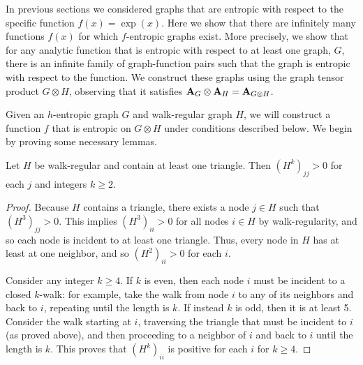 In previous sections we considered graphs that are entropic with respect to the specific function $f(x) = \exp(x)$.
Here we show that there are infinitely many functions $f(x)$ for which $f$-entropic graphs exist.
More precisely, we show that for any analytic function that is entropic with respect to at least one graph, $G$, there is an infinite family of graph-function pairs such that the graph is entropic with respect to the function.
We construct these graphs using the graph tensor product $G \otimes H$, observing that it
satisfies $\textbf{A}_{G} \otimes \textbf{A}_{H} = \textbf{A}_{G \otimes H}$.

Given an $h$-entropic graph $G$ and walk-regular graph $H$, we will construct a function $f$ that is entropic on $G \otimes H$ under conditions described below.
We begin by proving some necessary lemmas.
\begin{lemma}\label{lem:walk-reg-triangle}
  Let $H$ be walk-regular and contain at least one triangle.
  Then $(H^k)_{jj} > 0$ for each $j$ and integers $k \geq 2$.
\end{lemma}
\begin{proof}
  Because $H$ contains a triangle, there exists a node $j \in H$ such that $(H^3)_{jj} > 0$.
  This implies $(H^3)_{ii} > 0$ for all nodes $i \in H$ by walk-regularity,
  and so each node is incident to at least one triangle.
  Thus, every node in $H$ has at least at one neighbor, and so $(H^2)_{ii} > 0$ for each $i$.

  Consider any integer $k\geq 4$.
  If $k$ is even, then each node $i$ must be incident to a closed $k$-walk: for example, take the walk from node $i$ to any of its neighbors and back to $i$, repeating until the length is $k$.
  If instead $k$ is odd, then it is at least 5. Consider the walk starting at $i$, traversing the triangle that must be incident to $i$ (as proved above), and then proceeding to a neighbor of $i$ and back to $i$ until the length is $k$.
  This proves that $(H^k)_{ii}$ is positive for each $i$ for $k \geq 4$.
\end{proof}


